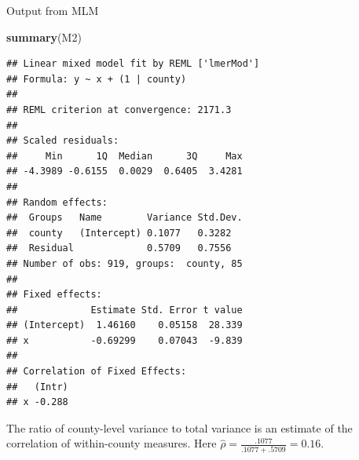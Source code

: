 \documentclass[ignorenonframetext,]{beamer}
\newenvironment{Shaded}{\begin{snugshade}}{\end{snugshade}}
\newcommand{\KeywordTok}[1]{\textcolor[rgb]{0.13,0.29,0.53}{\textbf{#1}}}
\newcommand{\NormalTok}[1]{#1}
\begin{document}
\begin{frame}[fragile]{Output from MLM}

\begin{Shaded}
\begin{Highlighting}[]
\KeywordTok{summary}\NormalTok{(M2)}
\end{Highlighting}
\end{Shaded}

\begin{verbatim}
## Linear mixed model fit by REML ['lmerMod']
## Formula: y ~ x + (1 | county)
## 
## REML criterion at convergence: 2171.3
## 
## Scaled residuals: 
##     Min      1Q  Median      3Q     Max 
## -4.3989 -0.6155  0.0029  0.6405  3.4281 
## 
## Random effects:
##  Groups   Name        Variance Std.Dev.
##  county   (Intercept) 0.1077   0.3282  
##  Residual             0.5709   0.7556  
## Number of obs: 919, groups:  county, 85
## 
## Fixed effects:
##             Estimate Std. Error t value
## (Intercept)  1.46160    0.05158  28.339
## x           -0.69299    0.07043  -9.839
## 
## Correlation of Fixed Effects:
##   (Intr)
## x -0.288
\end{verbatim}

 The ratio of county-level variance to total variance is an estimate of
the correlation of within-county measures. Here
\(\hat{\rho}=\frac{.1077}{.1077+.5709}=0.16\).

\end{frame}
\end{document}
